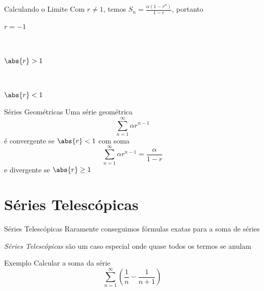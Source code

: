 \begin{frame}{Calculando o Limite}
	Com $r\neq 1$, temos \(S_n = \frac{\alpha(1-r^n)}{1-r}\), portanto
	\vspace{\baselineskip}
	\begin{description}
		\item[$r=-1$] \tabto{10mm}
		 \\[7mm]
		\item[$\abs{r}>1$] \tabto{10mm}
		 \\[7mm]
		\item[$\abs{r}<1$] \tabto{10mm}
	\end{description}
\end{frame}

\begin{frame}{Séries Geométricas}
	Uma série geométrica
	\[
    \sum_{n=1}^\infty \alpha r^{n-1}
  \]
	é convergente se $\abs{r}<1$ com soma
	\[
    \sum_{n=1}^\infty \alpha r^{n-1} = \frac{\alpha }{1-r}
  \]
	e divergente se $\abs{r}\geq 1$
\end{frame}

\section{Séries Telescópicas}

\begin{frame}{Séries Telescópicas}
	Raramente conseguimos fórmulas exatas para a soma de séries

	\pause
	\vspace{\baselineskip}
	\emph{Séries Telescópicas} são um caso especial onde quase todos os termos se anulam
\end{frame}

\begin{frame}{Exemplo}
	Calcular a soma da série
	\[\sum_{n=1}^{\infty} \left( \frac{1}{n} - \frac{1}{n+1} \right) \]
\end{frame}

